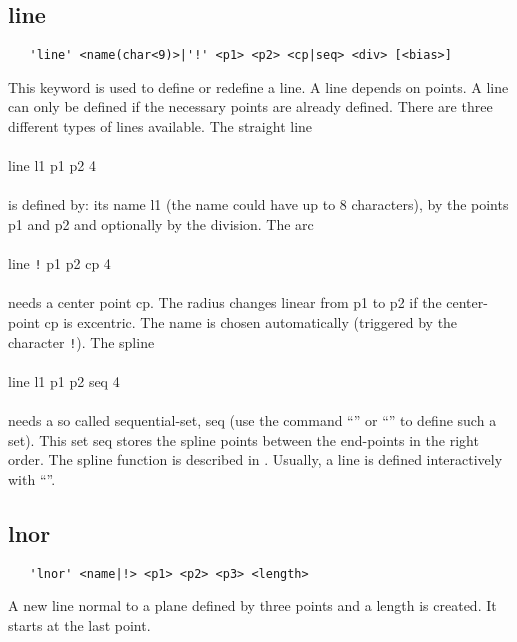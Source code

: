 \documentclass{article}
\begin{document}
\subsection{\label{line}line}
\begin{verbatim}
   'line' <name(char<9)>|'!' <p1> <p2> <cp|seq> <div> [<bias>] 
\end{verbatim}
This keyword is used to define or redefine a line. A line depends on points. A line can only be defined if the necessary points are already defined. There are three different types of lines available. The straight line\\\\
line l1 p1 p2 4\\\\
is defined by: its name l1 (the name could have up to 8 characters), by the points p1 and p2 and optionally by the division. The arc\\\\
line \verb_!_ p1 p2 cp 4\\\\
needs a center point cp. The radius changes linear from p1 to p2 if the center-point cp is excentric. The name is chosen automatically (triggered by the character \verb_!_). The spline\\\\
line l1 p1 p2 seq 4\\\\
needs a so called sequential-set, seq (use the command ``'' or ``'' to define such a set). This set seq stores the spline points between the end-points in the right order. The spline function is described in \cite{spline}. Usually, a line is defined interactively with ``''. 

\subsection{\label{lnor}lnor}
\begin{verbatim}
   'lnor' <name|!> <p1> <p2> <p3> <length> 
\end{verbatim}
A new line normal to a plane defined by three points and a length is created. It starts at the last point.
\end{document}
